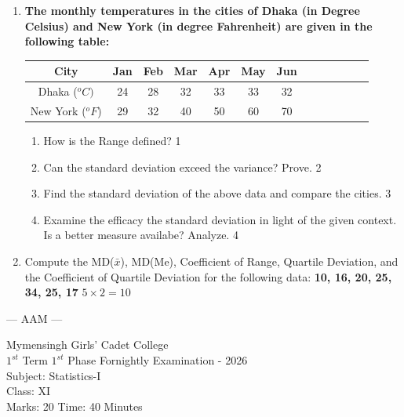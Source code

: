 \documentclass[12pt]{article}
\begin{document}
  \begin{enumerate}
  
     \item
  \textbf{The monthly temperatures in the cities of Dhaka (in Degree Celsius) and New York (in degree Fahrenheit) are given in the following table:}
  
  
\begin{table}[H]
\centering
\begin{tabular}{|c|c|c|c|c|c|c|c|c|c|c|c|c|}
\hline
City             & Jan  & Feb  & Mar  & Apr  & May  & Jun   \\ \hline
Dhaka ($^o C)$   & 24 & 28 & 32 & 33 & 33 & 32\\ \hline
New York ($^oF$) & 29   & 32   & 40   & 50   & 60   & 70  \\ \hline
\end{tabular}
\end{table}

  
  \begin{enumerate}
    \item
	How is the Range defined? \hfill 1
    \item
	Can the standard deviation exceed the variance? Prove. \hfill 2
    \item  
	Find the standard deviation of the above data and compare the cities. \hfill 3
    \item
	Examine the efficacy the standard deviation in light of the given context. \\ Is a better measure availabe? Analyze. \hfill 4
  \end{enumerate}
  
  \item {Compute the MD($\bar x$), MD(Me), Coefficient of Range, Quartile Deviation, and the Coefficient of Quartile Deviation for the following data: \textbf{10, 16, 20, 25, 34, 25, 17}}  \hfill $5 \times 2 = 10$

  

\end{enumerate}
\begin{center}
--- AAM ---
\end{center}
  \vspace{1cm}
  

\begin{center}
Mymensingh Girls' Cadet College \\
$1^{st}$ Term  $1^{st}$ Phase Fornightly Examination - 2026 \\
Subject: Statistics-I \\
Class: XI \\
Marks: 20 \hfill Time: 40 Minutes
\end{center}
\end{document}
